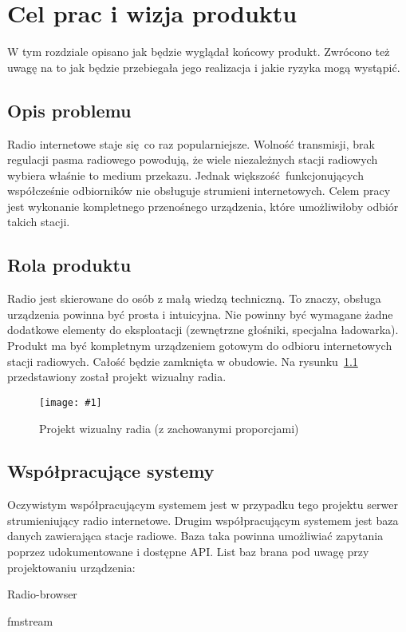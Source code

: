 \documentclass[polish]{aghengthesis}
\author{Norbert Morawski}
\date{\the\year}
\let\tempone\itemize
\let\temptwo\enditemize
\renewenvironment{itemize}{\tempone\setlength{\itemsep}{0cm}}{\temptwo}
\newcommand{\imgint}[4]{
	\begin{figure}[{#4}]
		\centering
		\texttt{[image: \#1]}
		\caption{#2}
		\label{#1}
	\end{figure}
}
\newcommand{\imgcs}[3]{\imgint{#1}{#2}{#3}{}}
\newcommand{\imgh}[3]{\imgint{#1}{#2}{#3}{H}}
\begin{document}
\lstset{inputencoding=utf8, basicstyle=\ttfamily}

\maketitle

\tableofcontents

\chapter{Cel prac i wizja produktu}
	W tym rozdziale opisano jak będzie wyglądał końcowy produkt. Zwrócono też uwagę na to jak będzie przebiegała jego realizacja i jakie ryzyka mogą wystąpić.
	
	\section{Opis problemu}
		Radio internetowe staje się co raz popularniejsze. Wolność transmisji, brak regulacji pasma radiowego powodują, że wiele niezależnych stacji radiowych wybiera właśnie to medium przekazu. Jednak większość funkcjonujących współcześnie odbiorników nie obsługuje strumieni internetowych. Celem pracy jest wykonanie kompletnego przenośnego urządzenia, które umożliwiłoby odbiór takich stacji.
		
	\section{Rola produktu}
		Radio jest skierowane do osób z małą wiedzą techniczną. To znaczy, obsługa urządzenia powinna być prosta i intuicyjna. Nie powinny być wymagane żadne dodatkowe elementy do eksploatacji (zewnętrzne głośniki, specjalna ładowarka). Produkt ma być kompletnym urządzeniem gotowym do odbioru internetowych stacji radiowych. Całość będzie zamknięta w obudowie. Na rysunku~\ref{1/radio_proj_trimmed} przedstawiony został projekt wizualny radia.
		
		\imgh{1/radio_proj_trimmed}{Projekt wizualny radia (z zachowanymi proporcjami)}{0.7}
		
	\section{Współpracujące systemy}
		Oczywistym współpracującym systemem jest w przypadku tego projektu serwer strumieniujący radio internetowe.
		Drugim współpracującym systemem jest baza danych zawierająca stacje radiowe. Baza taka powinna umożliwiać zapytania poprzez udokumentowane i dostępne API. List baz brana pod uwagę przy projektowaniu urządzenia:
		\begin{itemize}
			\item Radio-browser\textsuperscript{\cite{radio-browser}}
			\item fmstream\textsuperscript{\cite{fmstream}}
		\end{itemize}
		
\end{document}

